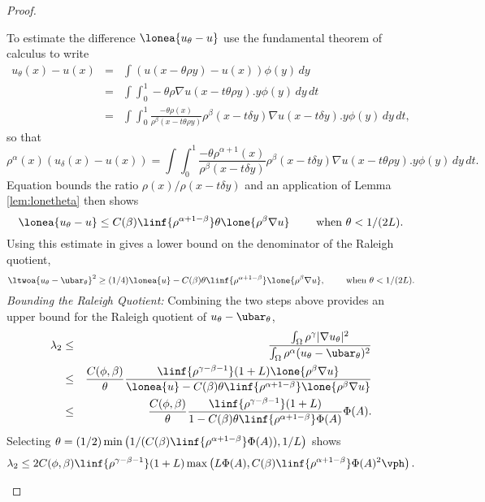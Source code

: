 \begin{proof}
\begin{itemize}
  To estimate the difference $\lonea{u_\theta - u}$ use the fundamental
  theorem of calculus to write
  \begin{eqnarray*}
    u_\theta(x) - u(x)
    &=& \int (u(x - \theta \rho y) - u(x)) \phi(y) \, dy \\
    &=& \int \! \int_0^1
    -\theta \rho \nabla u(x - t \theta \rho y).y \phi(y) \, dy \, dt \\
    &=& \int \! \int_0^1
    \frac{-\theta \rho(x)}{\rho^\beta(x-t\theta \rho y)} 
    \rho^\beta(x - t\delta y) \nabla u(x - t \delta y).y \phi(y) \, dy \, dt,
  \end{eqnarray*}
  so that 
  $$
  \rho^{\alpha}(x) ( u_\delta(x) - u(x) )
  = \int \! \int_0^1
  \frac{-\theta \rho^{\alpha+1}(x)}{\rho^\beta(x-t\delta y)} 
  \rho^\beta(x - t\delta y) 
  \nabla u(x - t \theta \rho y).y \phi(y) \, dy \, dt.
  $$
  Equation  bounds the ratio $\rho(x)/ \rho(x - t\delta y)$
  and an application of Lemma \ref{lem:lonetheta} then shows
  $$
  \lonea{u_\theta - u}
  \leq C(\beta) \linf{\rho^{\alpha+1-\beta}} \theta \lone{\rho^\beta \nabla u}
  \qquad \text{ when } \theta < 1 / (2L).
  $$
  Using this estimate in  gives a lower bound on the
  denominator of the Raleigh quotient,
  $$
  \ltwoa{u_\theta - \ubar_\theta}^2
  \geq (1/4) \lonea{u} 
  - C(\beta) \theta \linf{\rho^{\alpha+1-\beta}} \lone{\rho^\beta \nabla u},
  \qquad \text{ when } \theta < 1 / (2L).
  $$
  {\em Bounding the Raleigh Quotient:} Combining the two steps above
  provides an upper bound for the Raleigh quotient of $u_\theta - \ubar_\theta$,
  \begin{eqnarray*}
    \lambda_2 
    &\leq& \frac{\int_\Omega \rho^\gamma |\nabla u_\theta|^2}
    {\int_\Omega \rho^\alpha (u_\theta - \ubar_\theta)^2} \\
    &\leq&  \frac{C(\phi,\beta)}{\theta}
    \frac{\linf{\rho^{\gamma-\beta-1}} (1+L) \lone{\rho^\beta \nabla u}}
    {\lonea{u} 
      - C(\beta) \theta \linf{\rho^{\alpha+1-\beta}} \lone{\rho^\beta \nabla u}} \\
    &\leq&  \frac{C(\phi,\beta)}{\theta}
    \frac{\linf{\rho^{\gamma-\beta-1}} (1+L)}
    {1 - C(\beta) \theta \linf{\rho^{\alpha+1-\beta}} \Phi(A)} \Phi(A).
  \end{eqnarray*}
  Selecting $\theta = (1/2)
  \min\left(1/(C(\beta)\linf{\rho^{\alpha+1-\beta}} \Phi(A)), 1/L
  \right)$ shows
  \[
  \lambda_2 \leq 2 C(\phi,\beta)\linf{\rho^{\gamma-\beta-1}}(1+L) 
  \max\left(L \Phi(A), C(\beta)\linf{\rho^{\alpha+1-\beta}} \Phi(A)^2 \vph\right).
  \qedhere
  \]
\end{itemize}
\end{proof}
